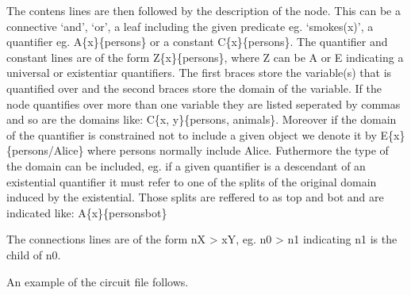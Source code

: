 \documentclass[letterpaper,10pt,english,openany,oneside]{sphinxmanual}
\begin{document}
The contens lines are then followed by the description of the node. This can be a connective ‘and’, ‘or’, a leaf including the given predicate eg. ‘smokes(x)’, a quantifier eg. A\{x\}\{persons\} or a constant C\{x\}\{persons\}. The quantifier and constant lines are of the form Z\{x\}\{persons\}, where Z can be A or E indicating a universal or existentiar quantifiers. The first braces store the variable(s) that is quantified over and the second braces store the domain of the variable. If the node quantifies over more than one variable they are listed seperated by commas and so are the domains like: C\{x, y\}\{persons, animals\}. Moreover if the domain of the quantifier is constrained not to include a given object we denote it by E\{x\}\{persons/Alice\} where persons normally include Alice. Futhermore the type of the domain can be included, eg. if a given quantifier is a descendant of an existential quantifier it must refer to one of the splits of the original domain induced by the existential. Those splits are reffered to as top and bot and are indicated like: A\{x\}\{persons\sphinxhyphen{}bot\}

The connections lines are of the form nX \sphinxhyphen{}\textgreater{} xY, eg. n0 \sphinxhyphen{}\textgreater{} n1 indicating n1 is the child of n0.

An example of the circuit file follows.
\end{document}
